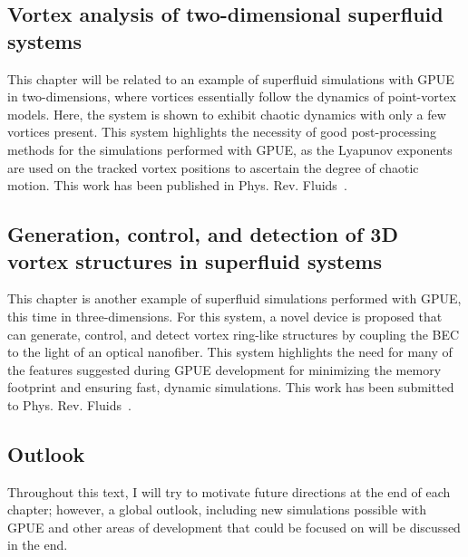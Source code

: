 \subsection*{Vortex analysis of two-dimensional superfluid systems}

This chapter will be related to an example of superfluid simulations with GPUE in two-dimensions, where vortices essentially follow the dynamics of point-vortex models.
Here, the system is shown to exhibit chaotic dynamics with only a few vortices present.
This system highlights the necessity of good post-processing methods for the simulations performed with GPUE, as the Lyapunov exponents are used on the tracked vortex positions to ascertain the degree of chaotic motion.
This work has been published in Phys. Rev. Fluids~\cite{zhang2019}.

\subsection*{Generation, control, and detection of 3D vortex structures in superfluid systems}

This chapter is another example of superfluid simulations performed with GPUE, this time in three-dimensions.
For this system, a novel device is proposed that can generate, control, and detect vortex ring-like structures by coupling the BEC to the light of an optical nanofiber.
This system highlights the need for many of the features suggested during GPUE development for minimizing the memory footprint and ensuring fast, dynamic simulations.
This work has been submitted to Phys. Rev. Fluids~\cite{schloss2019}.

\subsection*{Outlook}
Throughout this text, I will try to motivate future directions at the end of each chapter; however, a global outlook, including new simulations possible with GPUE and other areas of development that could be focused on will be discussed in the end.
